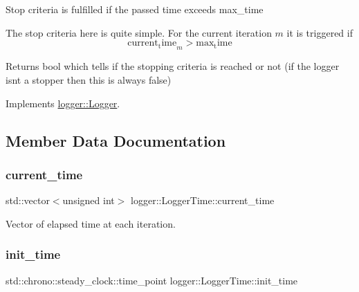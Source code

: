 Stop criteria is fulfilled if the passed time exceeds {\ttfamily max\+\_\+time} 

The stop criteria here is quite simple. For the current iteration $m$ it is triggered if \[ \mathrm{current_time}_m > \mathrm{max_time} \]

\begin{DoxyReturn}{Returns}
{\ttfamily bool} which tells if the stopping criteria is reached or not (if the logger isn\textquotesingle{}t a stopper then this is always false) 
\end{DoxyReturn}


Implements \mbox{\hyperlink{classlogger_1_1_logger_aed91421c07062b91cee158ef2bda7ae8}{logger\+::\+Logger}}.



\subsection{Member Data Documentation}
\mbox{\label{classlogger_1_1_logger_time_a9c26fbdef41cacef1e7f630839f3a4d2}} 
\subsubsection{\texorpdfstring{current\+\_\+time}{current\_time}}
{\footnotesize\ttfamily std\+::vector$<$unsigned int$>$ logger\+::\+Logger\+Time\+::current\+\_\+time\hspace{0.3cm}{\ttfamily [private]}}



Vector of elapsed time at each iteration. 

\mbox{\label{classlogger_1_1_logger_time_ace1b159544a0120633c506d36e0d22e0}} 
\subsubsection{\texorpdfstring{init\+\_\+time}{init\_time}}
{\footnotesize\ttfamily std\+::chrono\+::steady\+\_\+clock\+::time\+\_\+point logger\+::\+Logger\+Time\+::init\+\_\+time\hspace{0.3cm}{\ttfamily [private]}}



